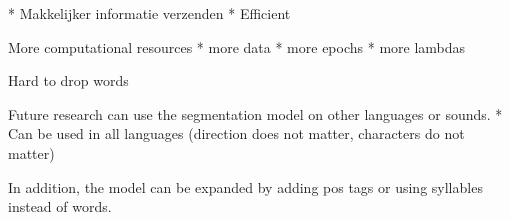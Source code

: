 

* Makkelijker informatie verzenden
* Efficient

More computational resources
* more data
* more epochs
* more lambdas

Hard to drop words

Future research can use the segmentation model on other languages or sounds.
* Can be used in all languages (direction does not matter, characters do not matter)

In addition, the model can be expanded by adding pos tags or using syllables instead of words.
